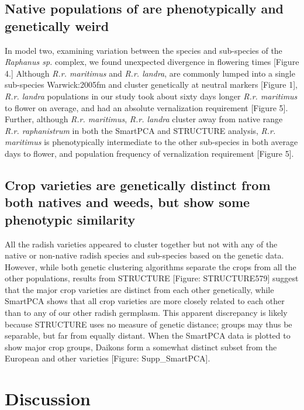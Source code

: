 \documentclass[twocolumn]{bmcart}%
\begin{document}
\subsection*{Native populations of are phenotypically and genetically weird}

In model two, examining variation between the species and sub-species of the \textit{Raphanus sp.} complex, we found unexpected divergence in flowering times [Figure 4.] Although \textit{R.r. maritimus} and \textit{R.r. landra}, are commonly lumped into a single sub-species {Warwick:2005fm} and cluster genetically at neutral markers [Figure 1], \textit{R.r. landra} populations in our study took about sixty days longer \textit{R.r. maritimus} to flower on average, and had an absolute vernalization requirement [Figure 5]. Further, although \textit{R.r. maritimus}, \textit{R.r. landra} cluster away from native range \textit{R.r. raphanistrum} in both the SmartPCA and STRUCTURE analysis, \textit{R.r. maritimus} is phenotypically intermediate to the other sub-species in both average days to flower, and population frequency of vernalization requirement [Figure 5].

\subsection*{Crop varieties are genetically distinct from both natives and weeds, but show some phenotypic similarity}

All the radish varieties appeared to cluster together but not with any of the native or non-native radish species and sub-species based on the genetic data. However, while both genetic clustering algorithms separate the crops from all the other populations, results from STRUCTURE [Figure: STRUCTURE579] suggest that the major crop varieties are distinct from each other genetically, while SmartPCA shows that all crop varieties are more closely related to each other than to any of our other radish germplasm. This apparent discrepancy is likely because STRUCTURE uses no measure of genetic distance; groups may thus be separable, but far from equally distant. When the SmartPCA data is plotted to show major crop groups, Daikons form a somewhat distinct subset from the European and other varieties [Figure: Supp\_SmartPCA].

\section*{Discussion}
%
%
%
\end{document}
